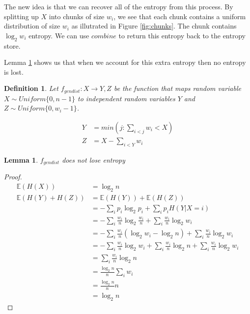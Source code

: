 \documentclass[12pt]{article}
\newtheorem{lemma}{Lemma}
\newtheorem{definition}{Definition}
\begin{document}
The new idea is that we can recover all of the entropy from this process. By splitting up $X$ into chunks of size $w_i$, we see that each chunk contains a uniform distribution of size $w_i$ as illutrated in Figure \ref{fig:chunks}. The chunk contains $\log_2w_i$ entropy. We can use $combine$ to return this entropy back to the entropy store.

Lemma \ref{lem:distribution-conservation} shows us that when we account for this extra entropy then no entropy is lost.

\begin{definition}
    Let $f_{gendist}: X \rightarrow Y, Z$ be the function that maps random variable $X \sim Uniform\{0,n-1\}$ to independent random variables $Y$ and $Z \sim Uniform\{0, w_i-1\}$.

    \begin{align}
    Y &= min(j : \sum_{i<j}w_i<X) \\
    Z &= X - \sum_{i<Y}w_i
    \end{align}

\end{definition}



\begin{lemma}
    \label{lem:distribution-conservation}
    $f_{gendist}$ does not lose entropy
\end{lemma}

\begin{proof}
    \begin{align}
    \mathbb{E}(H(X)) & = \log_2 n \\
    \mathbb{E}(H(Y) + H(Z)) &=  \mathbb{E}(H(Y)) + \mathbb{E}(H(Z)) \\
               & = - \sum_i p_i \log_2p_i + \sum_i p_iH(Y|X=i) \\
               & = - \sum_i \frac{w_i}{n} \log_2 \frac{w_i}{n} + \sum_i \frac{w_i}{n}\log_2 w_i \\
               & = - \sum_i \frac{w_i}{n}(\log_2 w_i - \log_2 n) + \sum_i \frac{w_i}{n}\log_2 w_i \\
               & = - \sum_i \frac{w_i}{n}\log_2 w_i + \sum_i \frac{w_i}{n} \log_2 n + \sum_i \frac{w_i}{n}\log_2 w_i \\
               & = \sum_i \frac{w_i}{n} \log_2 n \\
               & = \frac{\log_2 n}{n} \sum_i w_i \\
               & = \frac{\log_2 n}{n} n \\
               & = \log_2 n
    \end{align}
\end{proof}
\end{document}
